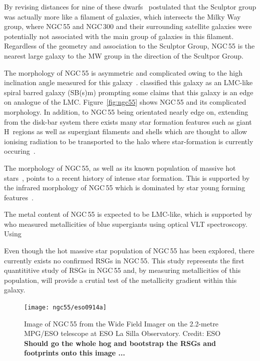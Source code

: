 By revising distances for nine of these dwarfs~\cite{2003A&A...404...93K} postulated that the Sculptor group was actually more like a filament of galaxies, which intersects the Milky Way group, where NGC\,55 and NGC\,300 and their surrounding satellite galaxies were potentially not associated with the main group of galaxies in this filament.
Regardless of the geometry and association to the Sculptor Group, NGC\,55 is the nearest large galaxy to the MW group in the direction of the Scultpor Group.

The morphology of NGC\,55 is asymmetric and complicated owing to the high inclination angle measured for this galaxy~\cite[up to 80\textdegree;][]{1986A&A...166...97H,2013MNRAS.434.3511W}.
\cite{1961ApJ...133..405D} classified this galaxy as an LMC-like spiral barred galaxy (SB(s)m) prompting some claims that this galaxy is an edge on analogue of the LMC.
Figure~\ref{fig:ngc55} shows NGC\,55 and its complicated morphology.
In addition, to NGC\,55 being orientated nearly edge on, extending from the disk-bar system there exists many star formation features such as giant H\,\2 regions as well as supergiant filaments and shells which are thought to allow ionising radiation to be transported to the halo where star-formation is currently occuring~\citep{1996AJ....112.2567F}.

The morphology of NGC\,55, as well as its known population of massive hot stars~\citep{2008A&A...485...41C,2012A&A...542A..79C}, points to a recent history of intense star formation.
This is supported by the infrared morphology of NGC\,55 which is dominated by star young forming features~\citep{2004ApJS..154..248E}.

The metal content of NGC\,55 is expected to be LMC-like, which is supported by~\cite{2012A&A...542A..79C} who measured metallicities of blue supergiants using optical VLT spectroscopy.
Using

Even though the hot massive star population of NGC\,55 has been explored,
there currently exists no confirmed RSGs in NGC\,55.
This study represents the first quantititive study of RSGs in NGC\,55 and, by measuring metallicities of this population, will provide a crutial test of the metallicity gradient within this galaxy.




\begin{figure}
 \centering
 \texttt{[image: ngc55/eso0914a]}
 \caption[Image of NGC\,55]{Image of NGC\,55 from the Wide Field Imager on the 2.2-metre MPG/ESO telescope at ESO La Silla Observatory. Credit: ESO
 \textbf{Should go the whole hog and bootstrap the RSGs and footprints onto this image ...}}
 \label{fig:ngc55-wide}
\end{figure}


